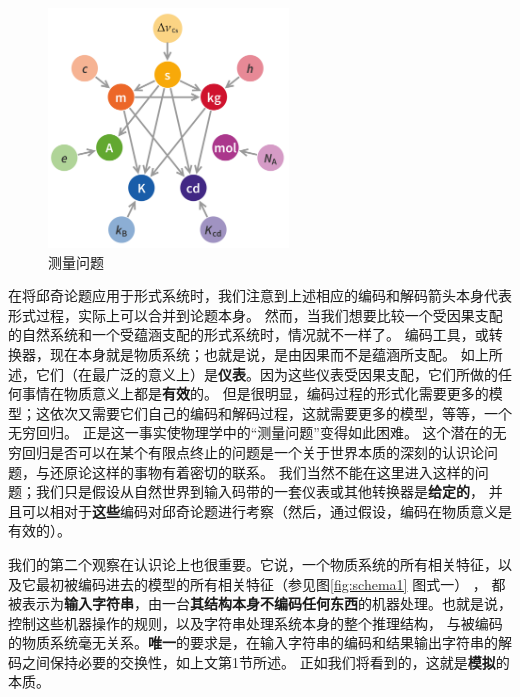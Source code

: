 \documentclass[a4paper,12pt]{article}
\begin{document}
\begin{figure}[ht]
\centering
\includegraphics[height=2.5in]{images/unit_relations_SI.png}
\caption[测量问题]{测量问题\footnotemark}
\end{figure}

在将邱奇论题应用于形式系统时，我们注意到上述相应的编码和解码箭头本身代表形式过程，实际上可以合并到论题本身。
然而，当我们想要比较一个受因果支配的自然系统和一个受蕴涵支配的形式系统时，情况就不一样了。
编码工具，或转换器，现在本身就是物质系统；也就是说，是由因果而不是蕴涵所支配。
如上所述，它们（在最广泛的意义上）是\textbf{仪表}。因为这些仪表受因果支配，它们所做的任何事情在物质意义上都是\textbf{有效}的。
但是很明显，编码过程的形式化需要更多的模型；这依次又需要它们自己的编码和解码过程，这就需要更多的模型，等等，一个无穷回归。
正是这一事实使物理学中的“\gls{测量问题}”变得如此困难。
这个潜在的无穷回归是否可以在某个有限点终止的问题是一个关于世界本质的深刻的认识论问题，与还原论这样的事物有着密切的联系。
我们当然不能在这里进入这样的问题；我们只是假设从自然世界到输入码带的一套仪表或其他转换器是\textbf{给定的}，
并且可以相对于\textbf{这些}编码对邱奇论题进行考察（然后，通过假设，编码在物质意义是有效的）。

我们的第二个观察在认识论上也很重要。它说，一个物质系统的所有相关特征，以及它最初被编码进去的模型的所有相关特征（参见图\ref{fig:schema1} 图式一） ，
都被表示为\textbf{输入字符串}，由一台\textbf{其结构本身不编码任何东西}的机器处理。也就是说，控制这些机器操作的规则，以及字符串处理系统本身的整个推理结构，
与被编码的物质系统毫无关系。\textbf{唯一}的要求是，在输入字符串的编码和结果输出字符串的解码之间保持必要的交换性，如上文第1节所述。
正如我们将看到的，这就是\textbf{\gls{模拟}}的本质。
\end{document}

